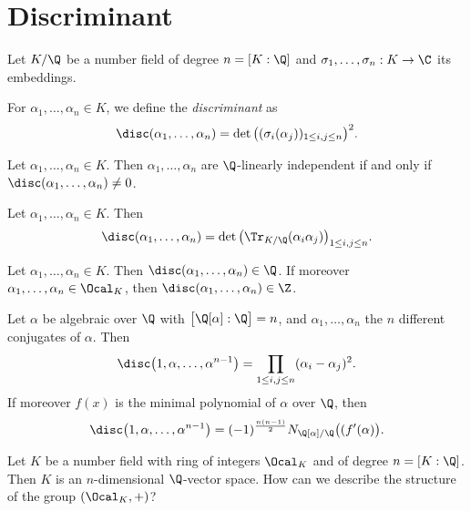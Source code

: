 \section{Discriminant}

Let \( K/\Q \) be a number field of degree \( n = [K:\Q] \) and \( \sigma_1, \dotsc, \sigma_n: K \to \C \) its embeddings.

\begin{defn*}[Discriminant]
	For \( \alpha_1, \dotsc, \alpha_n \in K \), we define the \emph{discriminant} as
	\[ \disc(\alpha_1, \dotsc, \alpha_n) = \det\big( (\sigma_i(\alpha_j))_{1 \leq i,j \leq n} \big)^2. \]
\end{defn*}

\begin{thmn}
	Let \( \alpha_1, \dotsc, \alpha_n \in K \).
	Then \( \alpha_1, \dotsc, \alpha_n \) are \( \Q \)-linearly independent if and only if \( \disc(\alpha_1, \dotsc, \alpha_n) \neq 0 \).
\end{thmn}

\begin{lem}
	Let \( \alpha_1, \dotsc, \alpha_n \in K \). Then
	\[ \disc(\alpha_1, \dotsc, \alpha_n) = \det \big( \Tr_{K/\Q} (\alpha_i \alpha_j) \big)_{1 \leq i,j \leq n}. \]
\end{lem}

\begin{cor}
	Let \( \alpha_1, \dotsc, \alpha_n \in K \).
	Then \( \disc(\alpha_1, \dotsc, \alpha_n) \in \Q \).
	If moreover \( \alpha_1, \dotsc, \alpha_n \in \Ocal_K \), then \( \disc(\alpha_1, \dotsc, \alpha_n) \in \Z \).
\end{cor}

\begin{thmn}
	Let \( \alpha \) be algebraic over \( \Q \) with \( \big[ \Q[\alpha] : \Q \big] = n \), and \( \alpha_1, \dotsc, \alpha_n \) the \( n \) different conjugates of \( \alpha \).
	Then
	\[ \disc \big( 1, \alpha, \dotsc, \alpha^{n-1} \big) = \prod_{1 \leq i,j \leq n} (\alpha_i - \alpha_j)^2. \]
	If moreover \( f(x) \) is the minimal polynomial of \( \alpha \) over \( \Q \), then
	\[ \disc \big(1, \alpha, \dotsc, \alpha^{n-1} \big) = (-1)^\frac{n(n-1)}{2} N_{\Q[\alpha]/\Q} \big( (f'(\alpha) \big). \]
\end{thmn}

\begin{frage*}
	Let \( K \) be a number field with ring of integers \( \Ocal_K \) and of degree \( n = [K:\Q] \).
	Then \( K \) is an \( n \)-dimensional \( \Q \)-vector space.
	How can we describe the structure of the group \( (\Ocal_K, +) \)?
\end{frage*}

